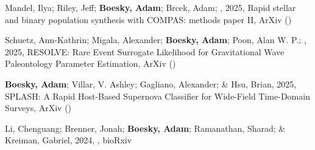 \item[{\color{numcolor}\scriptsize4}] Mandel, Ilya; Riley, Jeff; \textbf{Boesky, Adam}; Brcek, Adam; \etal, 2025, Rapid stellar and binary population synthesis with COMPAS: methods paper II, ArXiv ()

\item[{\color{numcolor}\scriptsize3}] Schuetz, Ann-Kathrin; Migala, Alexander; \textbf{Boesky, Adam}; Poon, Alan W. P.; \etal, 2025, RESOLVE: Rare Event Surrogate Likelihood for Gravitational Wave Paleontology Parameter Estimation, ArXiv ()

\item[{\color{numcolor}\scriptsize2}] \textbf{Boesky, Adam}; Villar, V. Ashley; Gagliano, Alexander; \& Hsu, Brian, 2025, SPLASH: A Rapid Host-Based Supernova Classifier for Wide-Field Time-Domain Surveys, ArXiv ()

\item[{\color{numcolor}\scriptsize1}] Li, Chenguang; Brenner, Jonah; \textbf{Boesky, Adam}; Ramanathan, Sharad; \& Kreiman, Gabriel, 2024, , bioRxiv